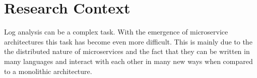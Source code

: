 \section{Research Context}

Log analysis can be a complex task. With the emergence of microservice architectures this task has become even more difficult. This is mainly due to the the distributed nature of microservices and the fact that they can be written in many languages and interact with each other in many new ways when compared to a monolithic architecture.

